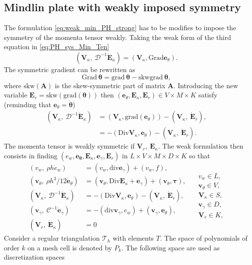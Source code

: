 \documentclass{ifacconf}
\begin{document}
\subsection{Mindlin plate with weakly imposed symmetry}
The formulation \eqref{eq:weak_min_PH_strong} has to be modifies to impose the symmetry of the momenta tensor weakly. Taking the weak form of the third equation in \eqref{eq:PH_sys_Min_Ten}
\[
(\bm{V}_\kappa, \ \mathcal{D}^{-1} \dot{\bm{E}}_\kappa) = (\bm{V}_\kappa, \mathrm{Grad}\bm{e}_\theta ). 
\]
The symmetric gradient can be rewritten as 
\[
\mathrm{Grad}\ \bm{\theta} = \mathrm{grad}\ \bm{\theta} - \mathrm{skw}\mathrm{grad}\ \bm{\theta},
\]
where $\mathrm{skw}(\bm{A})$ is the skew-symmetric part of matrix $\bm{A}$. Introducing the new variable $\bm{E}_r = \mathrm{skw}(\mathrm{grad}(\bm{\theta}))$ then $(\bm{e}_\theta, \bm{E}_\kappa, \bm{E}_r) \in V\times M\times K$ satisfy (reminding that $\bm{e}_\theta = \dot{\bm{\theta}}$)
\begin{equation*}
	\begin{aligned}
	(\bm{V}_\kappa, \ \mathcal{D}^{-1} \dot{\bm{E}}_\kappa) &= (\bm{V}_\kappa, \mathrm{grad}(\bm{e}_\theta)) - (\bm{V}_\kappa, \ \dot{\bm{E}}_r), \\
	&= -(\mathrm{Div}\bm{V}_\kappa, \bm{e}_\theta) - (\bm{V}_\kappa, \ \dot{\bm{E}}_r).
	\end{aligned}
\end{equation*}
The momenta tensor is weakly symmetric if $\bm{V}_r, \ \bm{E}_{\kappa}$. The weak formulation then consists in finding $(e_w, \bm{e}_{\bm{\theta}}, \bm{E}_{\kappa}, \bm{e}_{\gamma}, \bm{E}_{r})$ in $L \times V \times M \times D \times K$ so that 
 \begin{equation}
 \label{eq:weak_min_PH_weak}
 \begin{aligned}
 (v_w, \ \rho h \dot{e}_w) &= (v_w, \mathrm{div} \bm{e}_\gamma) + (v_w, f), \\ 
 (\bm{v}_\theta, \ \rho h^3/12  \dot{\bm{e}}_\theta) &= (\bm{v}_\theta, \mathrm{Div} \bm{E}_\kappa + \bm{e}_\gamma) + (\bm{v}_\theta, \bm{\tau}), \\  
 (\bm{V}_\kappa, \ \mathcal{D}^{-1} \dot{\bm{E}}_\kappa) &= -(\mathrm{Div} \bm{V}_\kappa,  \bm{e}_\theta) - (\bm{V}_\kappa, \ \dot{\bm{E}}_r), \\ 
 (\bm{v}_\gamma, \ \mathcal{C}^{-1} \dot{\bm{e}}_\gamma) &= -(\mathrm{div} \bm{v}_\gamma, e_w ) + (\bm{v}_\gamma, \bm{e}_{\theta}), \\ 
 (\bm{V}_r, \ \dot{\bm{E}}_\kappa) &= 0
 \end{aligned} \quad
 \begin{aligned}
 v_w \in L, \\
 \bm{v}_\theta \in V, \\
 \bm{V}_\kappa \in S, \\
 \bm{v}_\gamma \in D, \\
 \bm{V}_r \in K, \\
 \end{aligned}
 \end{equation}
Consider a regular triangulation $\mathcal{T}_h$ with elements $T$. The space of polynomials of order $k$ on a mesh cell is denoted by $P_k$. The following space are used as discretization spaces
\end{document}
